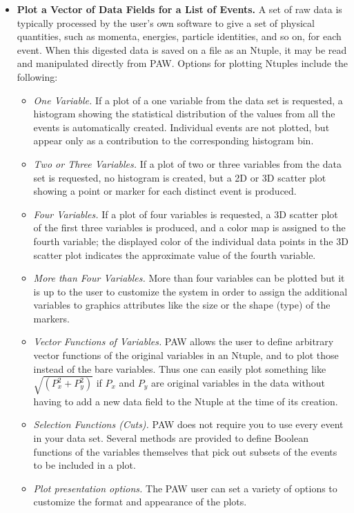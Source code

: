 \begin{itemize}
\item {\bf Plot a Vector of Data Fields for a List of Events.}
      A set of raw data is typically processed by the user's own software to
      give a set of physical quantities, such as momenta, energies, particle
      identities, and so on, for each event.  When this digested data is saved 
      on a file as an Ntuple, it may be read and manipulated directly from PAW. 
      Options for plotting Ntuples include the following:
 
\begin{itemize}
\item {\it One Variable.\/}  If a plot of a one variable from the data set is 
      requested, a histogram showing the statistical distribution of the values
      from all the events is automatically created. Individual events are not
      plotted, but appear only as a contribution to the corresponding 
      histogram bin.
\item {\it Two or Three Variables.\/}  If a plot of two or three variables from
      the data set is requested, no histogram is created, but a 2D or 3D scatter
      plot showing a point or marker for each distinct event is produced.
\item {\it Four Variables.\/}  If a plot
      of four variables is requested, a 3D scatter plot of the first three
      variables is produced, and a color map is assigned to the fourth variable;
      the displayed color of the individual data points in the 3D scatter plot 
      indicates the approximate value of the fourth variable.
\item {\it More than Four Variables.\/}  More than four variables can be plotted
      but it is up to the user to customize the system in order to assign the 
      additional variables to graphics attributes like the size or the shape 
      (type) of the markers.
\item {\it Vector Functions of Variables.\/}  PAW allows the user to define 
      arbitrary vector functions of the original variables in an Ntuple, and to
      plot those instead of the bare variables. Thus one can easily plot 
      something
      like \(\sqrt{(P_{x}^{2} + P_{y}^{2})}\) if \(P_{x}\) and \(P_{y}\) are
      original variables in the data without having to add a new data field to 
      the Ntuple at the time of its creation.
\item {\it Selection Functions (Cuts).\/}  PAW does not require you to use every
      event in your data set. Several methods are provided to define Boolean 
      functions of the variables themselves that pick out subsets of the events 
      to be included in a plot.
\item {\it Plot presentation options.\/} The PAW user can set a variety of 
      options to customize the format and appearance of the plots.
\end{itemize}
 

\end{itemize}
